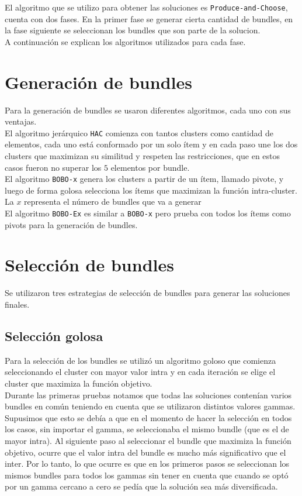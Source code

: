 El algoritmo que se utilizo para obtener las soluciones es \texttt{Produce-and-Choose}, cuenta con dos fases.
En la primer fase se generar cierta cantidad de bundles, en la fase siguiente se seleccionan los bundles que
son parte de la solucion.\\
A continuación se explican los algoritmos utilizados para cada fase.
\section{Generación de bundles}
Para la generación de bundles se usaron diferentes algoritmos, cada uno con sus ventajas.\\
El algoritmo jerárquico \texttt{HAC} comienza con tantos clusters como cantidad de elementos, 
cada uno está conformado por un solo ítem y en cada paso une los dos clusters que maximizan su 
similitud y respeten las restricciones, que en estos casos fueron no superar los $5$ elementos por 
bundle.\\
El algoritmo \texttt{BOBO-x} genera los clusters a partir de un ítem, llamado pivote, y luego de 
forma golosa selecciona los ítems que maximizan la función intra-cluster. La $x$ representa el 
número de bundles que va a generar\\
El algoritmo \texttt{BOBO-Ex} es similar a \texttt{BOBO-x} pero prueba con todos los ítems como 
pivots para la generación de bundles.
\section{Selección de bundles}
Se utilizaron tres estrategias de selección de bundles para generar las soluciones finales.
\subsection{Selección golosa}
Para la selección de los bundles se utilizó un algoritmo goloso que comienza seleccionando el 
cluster con mayor valor intra y en cada iteración se elige el cluster que maximiza la función 
objetivo.\\
Durante las primeras pruebas notamos que todas las soluciones contenían varios bundles en común 
teniendo en cuenta que se utilizaron distintos valores gammas. Supusimos que esto se debía a que en 
el momento de hacer la selección en todos los casos, sin importar el gamma, se seleccionaba el mismo 
bundle (que es el de mayor intra). Al siguiente paso al seleccionar el bundle que maximiza la 
función objetivo, ocurre que el valor intra del bundle es mucho más significativo que el inter. Por 
lo tanto, lo que ocurre es que en los primeros pasos se seleccionan los mismos bundles para todos 
los gammas sin tener en cuenta que cuando se optó por un gamma cercano a cero se pedía que la 
solución sea más diversificada.\\
